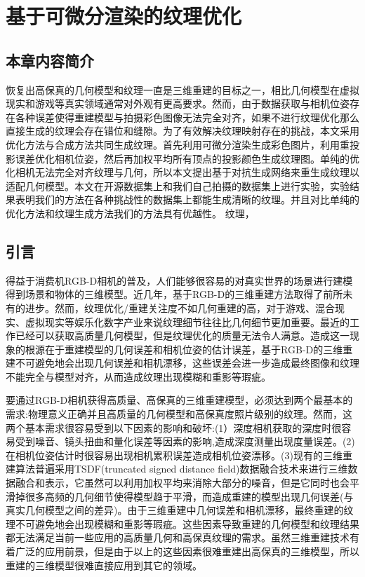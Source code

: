 \chapter{基于可微分渲染的纹理优化}
\section{本章内容简介}

恢复出高保真的几何模型和纹理一直是三维重建的目标之一，相比几何模型在虚拟现实和游戏等真实领域通常对外观有更高要求。然而，由于数据获取与相机位姿存在各种误差使得重建模型与拍摄彩色图像无法完全对齐，如果不进行纹理优化那么直接生成的纹理会存在错位和缝隙。为了有效解决纹理映射存在的挑战，本文采用优化方法与合成方法共同生成纹理。首先利用可微分渲染生成彩色图片，利用重投影误差优化相机位姿，然后再加权平均所有顶点的投影颜色生成纹理图。单纯的优化相机无法完全对齐纹理与几何，所以本文提出基于对抗生成网络来重生成纹理以适配几何模型。本文在开源数据集上和我们自己拍摄的数据集上进行实验，实验结果表明我们的方法在各种挑战性的数据集上都能生成清晰的纹理。并且对比单纯的优化方法和纹理生成方法我们的方法具有优越性。
纹理，
\section{引言}
得益于消费机RGB-D相机的普及，人们能够很容易的对真实世界的场景进行建模得到场景和物体的三维模型。近几年，基于RGB-D的三维重建方法取得了前所未有的进步。然而，纹理优化/重建关注度不如几何重建的高，对于游戏、混合现实、虚拟现实等娱乐化数字产业来说纹理细节往往比几何细节更加重要。最近的工作已经可以获取高质量几何模型，但是纹理优化的质量无法令人满意。造成这一现象的根源在于重建模型的几何误差和相机位姿的估计误差，基于RGB-D的三维重建不可避免地会出现几何误差和相机漂移，这些误差会进一步造成最终图像和纹理不能完全与模型对齐，从而造成纹理出现模糊和重影等瑕疵。\par
要通过RGB-D相机获得高质量、高保真的三维重建模型，必须达到两个最基本的需求:物理意义正确并且高质量的几何模型和高保真度照片级别的纹理。然而，这两个基本需求很容易受到以下因素的影响和破坏:(1）深度相机获取的深度时很容易受到噪音、镜头扭曲和量化误差等因素的影响,造成深度测量出现度量误差。(2)在相机位姿估计时很容易出现相机累积误差造成相机位姿漂移。(3)现有的三维重建算法普遍采用TSDF(truncated signed distance field)数据融合技术来进行三维数据融合和表示，它虽然可以利用加权平均来消除大部分的噪音，但是它同时也会平滑掉很多高频的几何细节使得模型趋于平滑，而造成重建的模型出现几何误差(与真实几何模型之间的差异)。由于三维重建中几何误差和相机漂移，最终重建的纹理不可避免地会出现模糊和重影等瑕疵。这些因素导致重建的几何模型和纹理结果都无法满足当前一些应用的高质量几何和高保真纹理的需求。虽然三维重建技术有着广泛的应用前景，但是由于以上的这些因素很难重建出高保真的三维模型，所以重建的三维模型很难直接应用到其它的领域。\par


